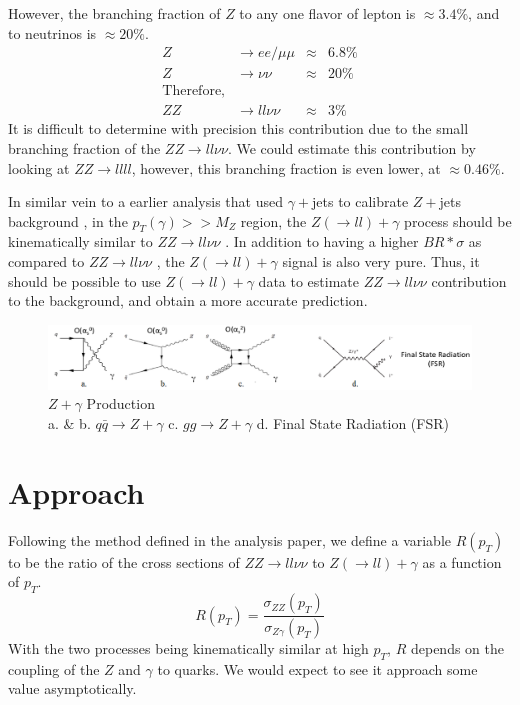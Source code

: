\documentclass[11pt,a4paper,final]{report}
\newcommand{\ZZ}{$ZZ\rightarrow ll\nu\nu$ }
\newcommand{\Zgam}{$Z(\rightarrow ll)+\gamma$ }
\begin{document}
However, the branching fraction of $Z$ to any one flavor of lepton is $\approx 3.4\%$, and to neutrinos is $\approx 20\%$.
\begin{align*}
	Z&\rightarrow ee/\mu\mu &\approx& 6.8\% \\
	Z&\rightarrow \nu\nu &\approx& 20\% \\
\text{Therefore},\\
	ZZ&\rightarrow ll\nu\nu &\approx& 3\%
\end{align*}
It is difficult to determine with precision this contribution due to the small branching fraction of the $ZZ\rightarrow ll\nu\nu$. We could estimate this contribution by looking at $ZZ\rightarrow llll$, however, this branching fraction is even lower, at $\approx 0.46 \%$.

In similar vein to a earlier analysis that used $\gamma+$jets to calibrate $Z+$jets background \cite{gammajet}, in the $p_T(\gamma) >> M_Z$ region, the \Zgam process should be kinematically similar to \ZZ. In addition to having a higher $BR*\sigma$ as compared to \ZZ, the \Zgam signal is also very pure. Thus, it should be possible to use \Zgam data to estimate \ZZ contribution to the background, and obtain a more accurate prediction.
\begin{figure}[h]
\centering
		\includegraphics[width=\linewidth]{Zg.png}
		\caption{ $Z+\gamma$ Production \\ a. \& b. $q\bar{q}\rightarrow Z+\gamma$ \hspace{2 cm} c. $gg\rightarrow Z+\gamma$ \hspace{2 cm} d. Final State Radiation (FSR)}
\end{figure}

\section{Approach}
Following the method defined in the analysis paper\cite{gammajet}, we define a variable $R(p_T)$ to be the ratio of the cross sections of \ZZ to \Zgam as a function of $p_T$.
\begin{equation}
	R(p_{T}) = \frac{\sigma_{ZZ}(p_{T})}{\sigma_{Z\gamma}(p_T)}
\end{equation}
With the two processes being kinematically similar at high $p_T$, $R$ depends on the coupling of the $Z$ and $\gamma$ to quarks. We would expect to see it approach some value asymptotically.
\end{document}
